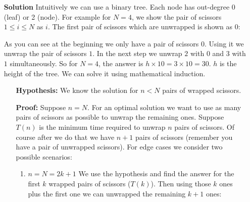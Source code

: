 \documentclass{book}
\begin{document}
	\begin{itemize}
		\item[\textbf{Solution}] Intuitively we can use a binary tree. Each node has out-degree 0 (leaf) or 2 (node). For example for $N = 4$, we show the pair of scissors $1\le i \le N$ as $i$. The first pair of scissors which are unwrapped is shown as $0$:

        \begin{figure*}[h!]
            \centering
        \end{figure*}
    	\FloatBarrier
    	As you can see at the beginning we only have a pair of scissors $0$. Using it we unwrap the pair of scissors $1$. In the next step we unwrap $2$ with $0$ and $3$ with $1$ simultaneously. So for $N=4$, the answer is $h \times 10 = 3 \times 10 = 30$. $h$ is the height of the tree. We can solve it using mathematical induction.
    	\begin{itemize}
    		\item[\textbf{Hypothesis:}] We know the solution for $n < N$ pairs of wrapped scissors.
    		\item[\textbf{Proof:}] Suppose $n = N$. For an optimal solution we want to use as many pairs of scissors as possible to unwrap the remaining ones. Suppose $T(n)$ is the minimum time required to unwrap $n$ pairs of scissors. Of course after we do that we have $n + 1$ pairs of scissors (remember you have a pair of unwrapped scissors). For edge cases we consider two possible scenarios:
    		\begin{enumerate}
    			\item $n = N = 2k + 1$ We use the hypothesis and find the answer for the first $k$ wrapped pairs of scissors ($T(k)$). Then using those $k$ ones plus the first one we can unwrapped the remaining $k +1$ ones:

\end{enumerate}
\end{itemize}
\end{itemize}
\end{document}
